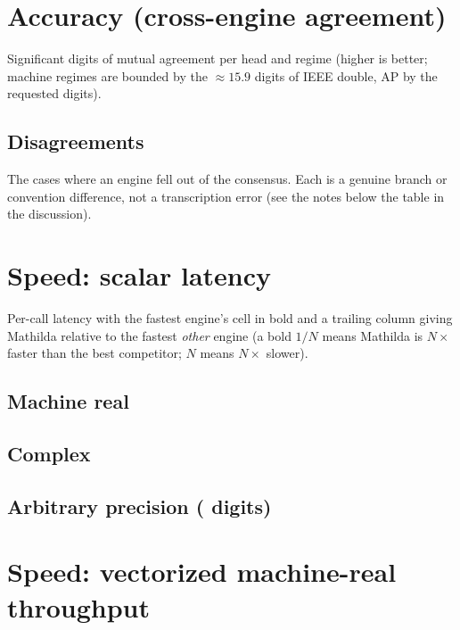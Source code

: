 \documentclass[11pt]{article}
\begin{document}


\section{Accuracy (cross-engine agreement)}

Significant digits of mutual agreement per head and regime (higher is better; machine
regimes are bounded by the $\approx 15.9$ digits of IEEE double, AP by the \sfapdps{}
requested digits).



\subsection{Disagreements}

The \sfndisagree{} cases where an engine fell out of the consensus. Each is a genuine
branch or convention difference, not a transcription error (see the notes below the
table in the discussion).



\section{Speed: scalar latency}

Per-call latency with the fastest engine's cell in bold and a trailing column giving
Mathilda relative to the fastest \emph{other} engine (a bold \mbox{$1/N$} means Mathilda is
$N\times$ faster than the best competitor; $N$ means $N\times$ slower).

\subsection{Machine real}


\subsection{Complex}


\subsection{Arbitrary precision (\sfapdps{} digits)}


\section{Speed: vectorized machine-real throughput}
\end{document}
